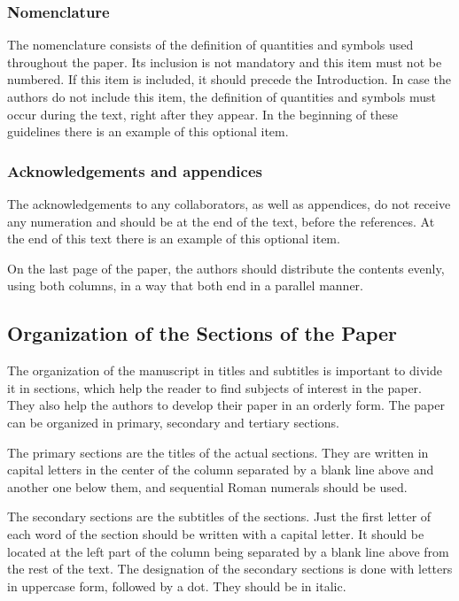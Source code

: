 \documentclass[english]{sobraep}
\begin{document}
\subsubsection{Nomenclature}

The nomenclature consists of the definition of quantities and symbols used throughout the paper. Its inclusion is not mandatory and this item must not be numbered. If this item is included, it should precede the Introduction. In case the authors do not include this item, the  definition of quantities and symbols must occur during the text, right after they appear. In the beginning of these guidelines there is an example of this optional item.

\subsubsection{Acknowledgements and appendices}

The acknowledgements to any collaborators, as well as appendices, do not receive any numeration and should be at the end of the text, before the references. At the end of this text there is an example of this optional item.

On the last page of the paper, the authors should distribute the contents evenly, using both columns, in a way that both end in a parallel manner.

\subsection{Organization of the Sections of the Paper}

The organization of the manuscript in titles and subtitles is important to divide it in sections, which help the reader to find subjects of interest in the paper. They also help the authors to develop their paper in an orderly form. The paper can be organized in primary, secondary and tertiary sections.

The primary sections are the titles of the actual sections. They are written in capital letters in the center of the column separated by a blank line above and another one below them, and sequential Roman numerals should be used.

The secondary sections are the subtitles of the sections. Just the first letter of each word of the section should be written with a capital letter. It should be located at the left part of the column being separated by a blank line above from the rest of the text. The designation of the secondary sections is done with letters in uppercase form, followed by a dot. They should be in italic.
\end{document}
